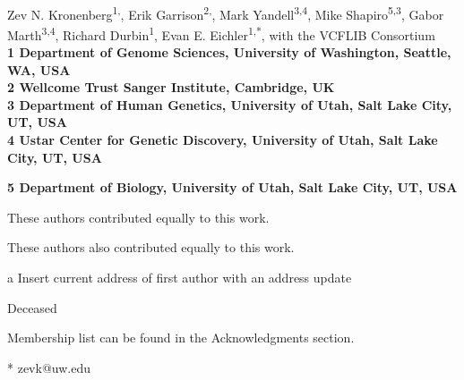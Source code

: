 \documentclass[10pt,letterpaper]{article}
\date{}
\begin{document}
\vspace*{0.35in}

\begin{flushleft}
{\Large
\textbf{}
}
\newline
\\
Zev N. Kronenberg\textsuperscript{1,\Yinyang},
Erik Garrison\textsuperscript{2,\Yinyang},
Mark Yandell\textsuperscript{3,4},
Mike Shapiro\textsuperscript{5,3},
Gabor Marth\textsuperscript{3,4},
Richard Durbin\textsuperscript{1},
Evan E. Eichler\textsuperscript{1,*},
with the VCFLIB Consortium\textsuperscript{\textpilcrow}
\\
\bigskip
\bf{1} Department of Genome Sciences, University of Washington, Seattle, WA, USA
\\
\bf{2} Wellcome Trust Sanger Institute, Cambridge, UK
\\
\bf{3} Department of Human Genetics, University of Utah, Salt Lake City, UT, USA
\\
\bf{4} Ustar Center for Genetic Discovery, University of Utah, Salt Lake City, UT, USA

\bf{5} Department of Biology, University of Utah, Salt Lake City, UT, USA
\\
\bigskip

% 
%
\Yinyang These authors contributed equally to this work.

\ddag These authors also contributed equally to this work.

\textcurrency a Insert current address of first author with an address update

\dag Deceased

\textpilcrow Membership list can be found in the Acknowledgments section.

* zevk@uw.edu

\end{flushleft}
\end{document}
